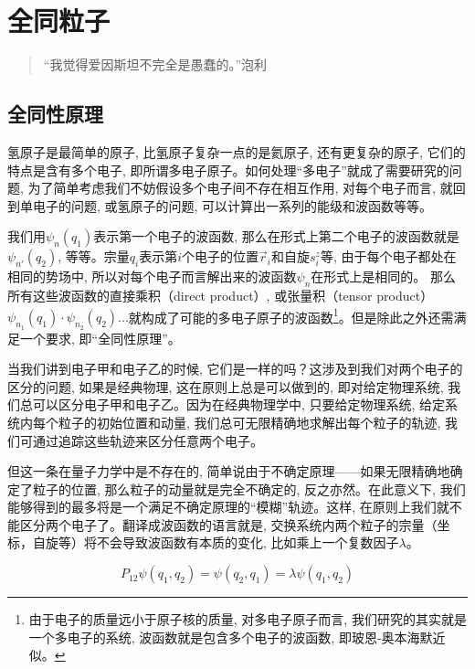\section{全同粒子}

\begin{quotation}
``我觉得爱因斯坦不完全是愚蠢的。''\qquad 泡利
\end{quotation}

\subsection{全同性原理}


氢原子是最简单的原子, 比氢原子复杂一点的是氦原子, 还有更复杂的原子,
它们的特点是含有多个电子,
即所谓多电子原子。如何处理``多电子''就成了需要研究的问题,
为了简单考虑我们不妨假设多个电子间不存在相互作用, 对每个电子而言,
就回到单电子的问题, 或氢原子的问题,
可以计算出一系列的能级和波函数等等。

我们用$\psi_n(q_1)$表示第一个电子的波函数,
那么在形式上第二个电子的波函数就是$\psi_{n'}(q_2)$,
等等。宗量$q_i$表示第$i$个电子的位置$ \vec{r}_i$和自旋$s_i^z$等,
由于每个电子都处在相同的势场中,
所以对每个电子而言解出来的波函数$\psi_n$在形式上是相同的。
那么所有这些波函数的直接乘积（direct product）, 或张量积（tensor
product）$\psi_{n_1}(q_1) \cdot \psi_{n_2}(q_2)
...$就构成了可能的多电子原子的波函数\footnote{由于电子的质量远小于原子核的质量,
对多电子原子而言, 我们研究的其实就是一个多电子的系统,
波函数就是包含多个电子的波函数,
即玻恩-奥本海默近似。}。但是除此之外还需满足一个要求,
即``全同性原理''。


当我们讲到电子甲和电子乙的时候,
它们是一样的吗？这涉及到我们对两个电子的区分的问题, 如果是经典物理,
这在原则上总是可以做到的, 即对给定物理系统,
我们总可以区分电子甲和电子乙。因为在经典物理学中, 只要给定物理系统,
给定系统内每个粒子的初始位置和动量,
我们总可无限精确地求解出每个粒子的轨迹,
我们可通过追踪这些轨迹来区分任意两个电子。


但这一条在量子力学中是不存在的,
简单说由于不确定原理——如果无限精确地确定了粒子的位置,
那么粒子的动量就是完全不确定的, 反之亦然。在此意义下,
我们能够得到的最多将是一个满足不确定原理的``模糊''轨迹。这样,
在原则上我们就不能区分两个电子了。翻译成波函数的语言就是,
交换系统内两个粒子的宗量（坐标，自旋等）将不会导致波函数有本质的变化,
比如乘上一个复数因子$\lambda$。

\begin{equation*}
  P_{12} \psi(q_1,q_2) = \psi(q_2,q_1) = \lambda \psi(q_1,q_2)
\end{equation*}


